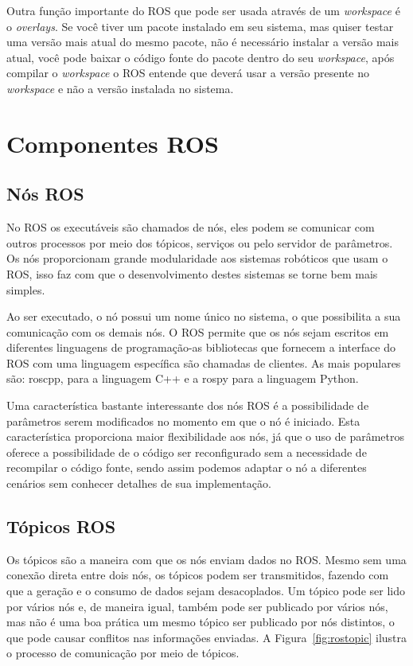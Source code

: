 Outra função importante do ROS que pode ser usada através de um \textit{workspace} é o \textit{overlays}. Se você tiver um pacote instalado em seu sistema, mas quiser testar uma versão mais atual do mesmo pacote, não é necessário instalar a versão mais atual, você pode baixar o código fonte do pacote dentro do seu \textit{workspace}, após compilar o \textit{workspace} o ROS entende que deverá usar a versão presente no \textit{workspace} e não a versão instalada no sistema.


\section{Componentes ROS}

\subsection{Nós ROS}
No ROS os executáveis são chamados de nós, eles podem se comunicar com outros processos por meio dos tópicos, serviços ou pelo servidor de parâmetros. Os nós proporcionam grande modularidade aos sistemas robóticos que usam o ROS, isso faz com que o desenvolvimento destes sistemas se torne bem mais simples.

Ao ser executado, o nó possui um nome único no sistema, o que possibilita a sua comunicação com os demais nós. O ROS permite que os nós sejam escritos em diferentes linguagens de programação-as bibliotecas que fornecem a interface do ROS com uma linguagem específica são chamadas de clientes. As mais populares são: roscpp, para a linguagem C++ e a rospy para a linguagem Python.

Uma característica bastante interessante dos nós ROS é a possibilidade de parâmetros serem modificados no momento em que o nó é iniciado. Esta característica proporciona maior flexibilidade aos nós, já que o uso de parâmetros oferece a possibilidade de o código ser reconfigurado sem a necessidade de recompilar o código fonte, sendo assim podemos adaptar o nó a diferentes cenários sem conhecer detalhes de sua implementação. 


\subsection{Tópicos ROS}

Os tópicos são a maneira com que os nós enviam dados no ROS\@. Mesmo sem uma conexão direta entre dois nós, os tópicos podem ser transmitidos, fazendo com que a geração e o consumo de dados sejam desacoplados. Um tópico pode ser lido por vários nós e, de maneira igual, também pode ser publicado por vários nós, mas não é uma boa prática um mesmo tópico ser publicado por nós distintos, o que pode causar conflitos nas informações enviadas. A Figura~\ref{fig:rostopic} ilustra o processo de comunicação por meio de tópicos.

